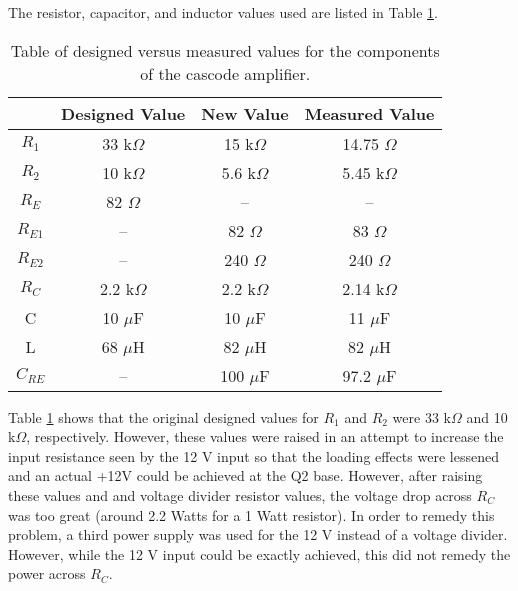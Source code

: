 \documentclass[12pt,letterpaper]{report}
\begin{document}

The resistor, capacitor, and inductor values used are listed in Table \ref{tab:values}.
\begin{table}[H]
\centering
\begin{tabular}{|c|c|c|c|}
	\hline
	 & Designed Value & New Value & Measured Value \\
	\hline
	$R_1$ & 33 k$\Omega$ & 15 k$\Omega$ &  14.75 $\Omega$\\	%
	\hline
	$R_2$ & 10 k$\Omega$ & 5.6 k$\Omega$ & 5.45 k$\Omega$ \\
	\hline
	$R_E$ & 82 $\Omega$& -- &--\\
	\hline
	$R_{E1}$ &  --& 82 $\Omega$&83 $\Omega$\\
	\hline
	$R_{E2}$ &  --& 240 $\Omega$ &240 $\Omega$\\
	\hline
	$R_C$ & 2.2 k$\Omega$ & 2.2 k$\Omega$ &2.14 k$\Omega$\\
	\hline
	C & 10 $\mu$F & 10 $\mu$F &11 $\mu$F\\	%
	\hline
	L & 68 $\mu$H & 82 $\mu$H &82 $\mu$H\\
	\hline
	$C_{RE}$& -- & 100 $\mu$F &97.2 $\mu$F\\	%
	\hline
	
\end{tabular}
\caption{Table of designed versus measured values for the components of the cascode amplifier.}
\label{tab:values}
\end{table}

Table \ref{tab:values} shows that the original designed values for $R_1$ and $R_2$ were 33 k$\Omega$ and 10 k$\Omega$, respectively. However, these values were raised in an attempt to increase the input resistance seen by the 12 V input so that the loading effects were lessened and an actual +12V could be achieved at the Q2  base. However, after raising these values and and voltage divider resistor values, the voltage drop across $R_C$ was too great (around 2.2 Watts for a 1 Watt resistor). In order to remedy this problem, a third power supply was used for the 12 V instead of a voltage divider. However, while the 12 V input could be exactly achieved, this did not remedy the power across $R_C$. 

\end{document}
